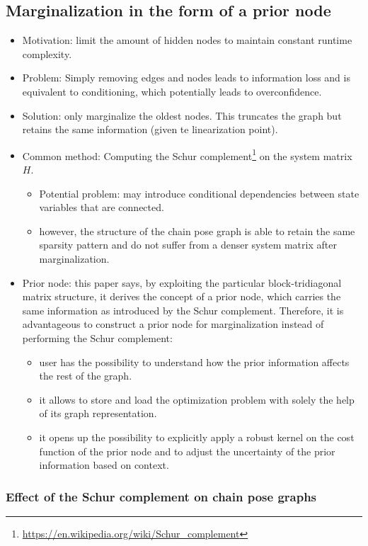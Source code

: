 \documentclass[letterpaper,11pt]{article}
\begin{document}
\subsection{Marginalization in the form of a prior node}

\begin{itemize}
	\item Motivation: limit the amount of hidden nodes to maintain constant runtime complexity.
	\item Problem: Simply removing edges and nodes leads to information loss and is equivalent to conditioning, which potentially leads to overconfidence.
	\item Solution: only marginalize the oldest nodes. This truncates the graph but retains the same information (given te linearization point).
	\item Common method: Computing the Schur complement\footnote{\url{https://en.wikipedia.org/wiki/Schur_complement}} on the system matrix $H$.
	\begin{itemize}
		\item Potential problem: may introduce conditional dependencies between state variables that are connected.
		\item however, the structure of the chain pose graph is able to retain the same sparsity pattern and do not suffer from a denser system matrix after marginalization.
	\end{itemize}
	\item Prior node: this paper says, by exploiting the particular block-tridiagonal matrix structure, it derives the concept of a prior node, which carries the same information as introduced by the Schur complement. Therefore, it is advantageous to construct a prior node for marginalization instead of performing the Schur complement:
	\begin{itemize}
		\item user has the possibility to understand how the prior information affects the rest of the graph.
		\item it allows to store and load the optimization problem with solely the help of its graph representation.
		\item it opens up the possibility to explicitly apply a robust kernel on the cost function of the prior node and to adjust the uncertainty of the prior information based on context.
	\end{itemize}
\end{itemize}

\subsubsection{Effect of the Schur complement on chain pose graphs}
\end{document}
